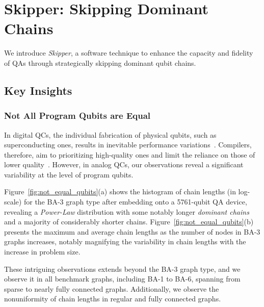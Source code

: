 \newpage

\section{Skipper: Skipping Dominant Chains}
We introduce \emph{Skipper}, a software technique to enhance the capacity and fidelity of QAs through strategically skipping dominant qubit chains. 


\subsection{Key Insights} \label{subsec:method_insights}

\subsubsection{Not All Program Qubits are Equal}

In digital QCs, the individual fabrication of physical qubits, such as superconducting ones, results in inevitable performance variations~\cite{tannu2019not}. 
Compilers, therefore, aim to prioritizing high-quality ones and limit the reliance on those of lower quality~\cite{tannu2019not,li2018tackling,noiseadaptive}.
However, in analog QCs, our observations reveal a significant variability at the level of program qubits.

Figure~\ref{fig:not_equal_qubits}(a) shows the histogram of chain lengths (in log-scale) for the BA-3 graph type after embedding onto a 5761-qubit QA device, revealing a \emph{Power-Law} distribution with some notably longer \emph{dominant chains} and a majority of considerably shorter chains.
Figure~\ref{fig:not_equal_qubits}(b) presents the maximum and average chain lengths as the number of nodes in BA-3 graphs increases, notably magnifying the variability in chain lengths with the increase in problem size.

These intriguing observations extends beyond the BA-3 graph type, and we observe it in all benchmark graphs, including BA-1 to BA-6, spanning from sparse to nearly fully connected graphs. 
Additionally, we observe the nonuniformity of chain lengths in regular and fully connected graphs. 



